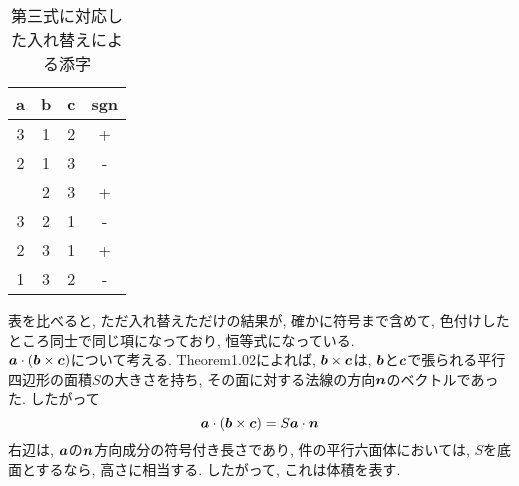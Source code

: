 \documentclass{jsarticle}
\newcommand*{\mbold}[1]{\mbox{\boldmath $#1$}}
\begin{document}
\begin{table}[hbtp]
  \caption{第三式に対応した入れ替えによる添字}
  \centering
  \begin{tabular}{|c|c|c|c|}
    \hline
    a & b & c & sgn \\
    \hline \hline
    \rowcolor{cyan}3 & 1 & 2 & + \\
    \hdashline
    \rowcolor{red}2 & 1 & 3 & - \\
    \hdashline
    1 & 2 & 3 & + \\
    \hdashline
    \rowcolor{magenta}3 & 2 & 1 & - \\
    \hdashline
    \rowcolor{green}2 & 3 & 1 & + \\
    \hdashline
    \rowcolor{yellow}1 & 3 & 2 & - \\
    \hline
  \end{tabular}
\end{table}
表を比べると, ただ入れ替えただけの結果が, 確かに符号まで含めて, 色付けしたところ同士で同じ項になっており, 恒等式になっている. 
\\

$\mbold{a} \cdot (\mbold{b} \times \mbold{c})$について考える. Theorem1.02によれば, $\mbold{b} \times \mbold{c}$は, $\mbold{b}$と$\mbold{c}$で張られる平行四辺形の面積$S$の大きさを持ち, その面に対する法線の方向$\mbold{n}$のベクトルであった. 
したがって
\[
  \mbold{a} \cdot (\mbold{b} \times \mbold{c}) = S \mbold{a} \cdot \mbold{n}
\]
右辺は, $\mbold{a}$の$\mbold{n}$方向成分の符号付き長さであり, 件の平行六面体においては, $S$を底面とするなら, 高さに相当する. 
したがって, これは体積を表す. 
\end{document}
